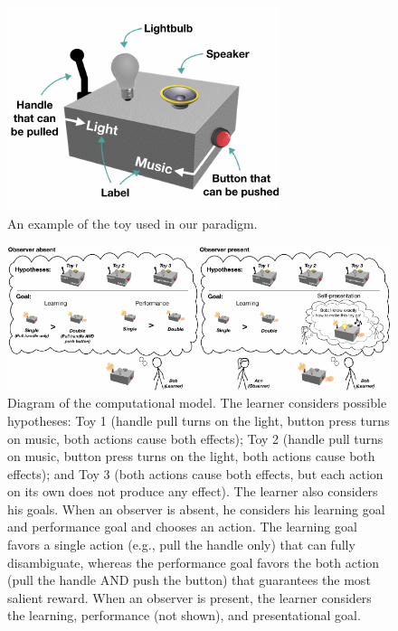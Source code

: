\documentclass[10pt, letterpaper]{article}
\newenvironment{CodeChunk}{}{}
\begin{document}
\begin{CodeChunk}
\begin{figure}[b]

{\centering \includegraphics[width=0.65\linewidth]{figs/toy-1} 

}

\caption[An example of the toy used in our paradigm]{An example of the toy used in our paradigm.}\label{fig:toy}
\end{figure}
\end{CodeChunk}

\begin{CodeChunk}
\begin{figure}[tb]

{\centering \includegraphics[width=0.95\linewidth]{figs/model_diagram-1} 

}

\caption[Diagram of the computational model]{Diagram of the computational model. The learner considers possible hypotheses: Toy 1 (handle pull turns on the light, button press turns on music, both actions cause both effects); Toy 2 (handle pull turns on music, button press turns on the light, both actions cause both effects); and Toy 3 (both actions cause both effects, but each action on its own does not produce any effect). The learner also considers his goals. When an observer is absent, he considers his learning goal and performance goal and chooses an action. The learning goal favors a single action (e.g., pull the handle only) that can fully disambiguate, whereas the performance goal favors the both action (pull the handle AND push the button) that guarantees the most salient reward. When an observer is present, the learner considers the learning, performance (not shown), and presentational goal.}\label{fig:model_diagram}
\end{figure}
\end{CodeChunk}
\end{document}
